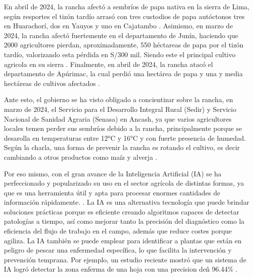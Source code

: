 En abril de 2024, la rancha afectó a sembríos de papa nativa en la sierra de Lima, según resportes el tizón tardío arrasó con tres custodios de papa autóctonos tres en Huarachorí, dos en Yauyos y uno en Cajatambo \parencite{cr_rancha3}. Asimismo, en marzo de 2024, la rancha afectó fuertemente en el departamento de Junín, haciendo que 2000 agricultores pierdan, aproximadamente, 550 héctareas de papa por el tizón tardío, valorizando esta pérdida en S/300 mil. Siendo este el principal cultivo agricola en su sierra \parencite{cr_rancha4}. Finalmente, en abril de 2024, la rancha atacó el departamento de Apúrimac, la cual perdió una hectárea de papa y una y media hectáreas de cultivos afectados \parencite{cr_rancha5}.

Ante esto, el gobierno se ha visto obligado a concientizar sobre la rancha, en marzo de 2024, el Servicio para el Desarrollo Integral Rural (Sedir) y Servicio Nacional de Sanidad Agraria (Senasa) en Ancash, ya que varios agricultores locales temen perder sus sembríos debido a la rancha, principalmente porque se desarolla en temperaturas entre 12°C y 16°C y con fuerte presencia de humedad. Según la charla, una forma de prevenir la rancha es rotando el cultivo, es decir cambiando a otros productos como maíz y alverja \parencite{cr_agroinforma2}.

Por eso mismo, con el gran avance de la Inteligencia Artificial (IA) se ha perfeccionado y popularizado su uso en el sector agrícola de distintas formas, ya que es una herramienta útil y apta para procesar enormes cantidades de información rápidamente. . La IA es una alternativa tecnología que puede brindar soluciones prácticas porque es eficiente creando algoritmos capaces de detectar patologías a tiempo, así como mejorar tanto la precisión del diagnóstico como la eficiencia del flujo de trabajo en el campo, además que reduce costes porque agiliza. La IA también se puede emplear para identificar a plantas que están en peligro de pescar una enfermedad específica, lo que facilita la intervención y prevención temprana. Por ejemplo, un estudio reciente mostró que un sistema de IA logró detectar la zona enferma de una hoja con una precision deñ 96.44\% \parencite{cr_iaplanta}.

